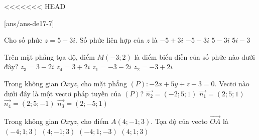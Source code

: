 <<<<<<< HEAD

\begin{name}
	{\tenchude}
	{\tendethi}
	{\tentruong}
	{\thoigian}
\end{name}
[ans/ans-de17-7]

\begin{ex}%
Cho số phức $z=5+3 i$. Số phức liên hợp của $z$ là
\choice
{$-5+3 i$}
{$-5-3 i$}
{\True $5-3 i$}
{$5 i-3$}

\end{ex}
\begin{ex}%
Trên mặt phẳng tọa độ, điểm $M(-3; 2)$ là điểm biểu diễn của số phức nào dưới đây?
\choice
{$z_3=3-2 i$}
{$z_4=3+2 i$}
{$z_1=-3-2 i$}
{\True $z_2=-3+2 i$}

\end{ex}
\begin{ex}%
Trong không gian $O x y z$, cho mặt phẳng $(P)\colon-2 x+5 y+z-3=0$.
Vectơ nào dưới đây là một vectơ pháp tuyến của $(P)$?
\choice
{\True $\overrightarrow{n_2}=(-2; 5; 1)$}
{$\overrightarrow{n_1}=(2; 5; 1)$}
{$\overrightarrow{n_4}=(2; 5;-1)$}
{$\overrightarrow{n_3}=(2;-5; 1)$}

\end{ex}
\begin{ex}%
Trong không gian $O x y z$, cho điểm $A(4;-1; 3)$. Tọa độ của vecto $\overrightarrow{OA}$ là
\choice
{$(-4; 1; 3)$}
{\True $(4;-1; 3)$}
{$(-4; 1;-3)$}
{$(4; 1; 3)$}

\end{ex}
\begin{ex}%
{\vspace{-0.5cm}
}

\end{ex}
